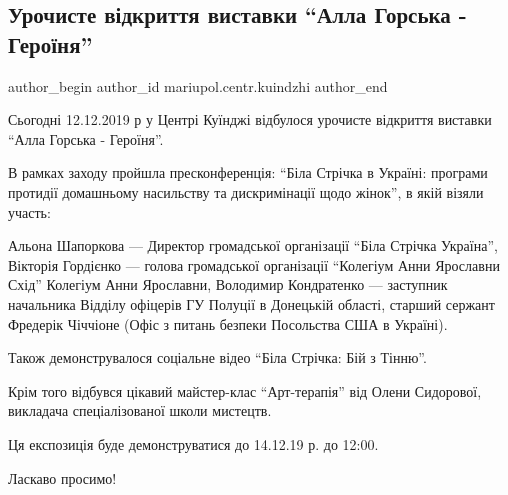  
 
 
 
 

\subsection{Урочисте відкриття виставки \enquote{Алла Горська - Героїня}}
\label{sec:12_12_2019.fb.mariupol.centr.kuindzhi.1.vystavka_alla_gorska_geroinja}

\ifcmt
 author_begin
   author_id mariupol.centr.kuindzhi
 author_end
\fi

Сьогодні 12.12.2019 р у Центрі Куїнджі відбулося урочисте відкриття виставки
\enquote{Алла Горська - Героїня}.

В рамках заходу пройшла пресконференція: \enquote{Біла Стрічка в Україні: програми
протидії домашньому насильству та дискримінації щодо жінок}, в якій візяли
участь: 

Альона Шапоркова — Директор громадської організації \enquote{Біла Стрічка Україна},
Вікторія Гордієнко — голова громадської організації \enquote{Колегіум Анни Ярославни
Схід} Колегіум Анни Ярославни, Володимир Кондратенко — заступник начальника
Відділу офіцерів ГУ Полуції в Донецькій області, старший сержант Фредерік
Чіччіоне (Офіс з питань безпеки Посольства США в Україні).

Також демонструвалося  соціальне відео \enquote{Біла Стрічка: Бій з Тінню}.

Крім того відбувся цікавий майстер-клас \enquote{Арт-терапія} від Олени
Сидорової, викладача спеціалізованої школи мистецтв.

Ця експозиція буде демонструватися до 14.12.19 р. до 12:00.

Ласкаво просимо!


